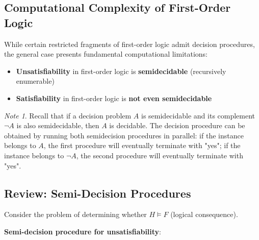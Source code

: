 \documentclass[11pt,a4paper]{article}
\theoremstyle{definition}
\theoremstyle{plain}
\theoremstyle{remark}
\newtheorem*{remark}{Note}
\begin{document}
\subsection{Computational Complexity of First-Order Logic}

While certain restricted fragments of first-order logic admit decision procedures, the general case presents fundamental computational limitations:

\begin{tcolorbox}[colback=red!5!white,colframe=red!75!black,title=\textbf{Decidability in First-Order Logic}]
\begin{itemize}
    \item \textbf{Unsatisfiability} in first-order logic is \textbf{semidecidable} (recursively enumerable)
    \item \textbf{Satisfiability} in first-order logic is \textbf{not even semidecidable}
\end{itemize}
\end{tcolorbox}

\begin{remark}
Recall that if a decision problem $A$ is semidecidable and its complement $\neg A$ is also semidecidable, then $A$ is decidable. The decision procedure can be obtained by running both semidecision procedures in parallel: if the instance belongs to $A$, the first procedure will eventually terminate with "yes"; if the instance belongs to $\neg A$, the second procedure will eventually terminate with "yes".
\end{remark}

\subsection{Review: Semi-Decision Procedures}

Consider the problem of determining whether $H \models F$ (logical consequence).

\textbf{Semi-decision procedure for unsatisfiability}:
\begin{center}
\end{center}
\end{document}
